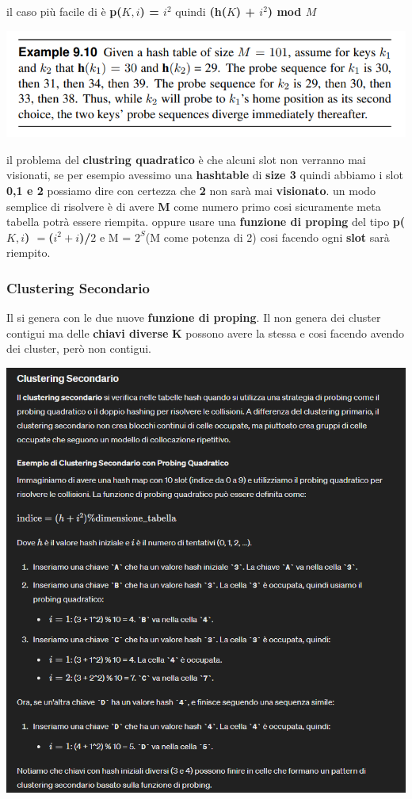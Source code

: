 il caso più facile di è\textbf{ p($K,i$) = $i^2$} quindi \textbf{(h($K$) + $i^2$) mod $M$}
\begin{center}
    \includegraphics[scale = 0.6]{Capitoli/HashTable/Esempi/EsempioQuadratic.png}
\end{center}
il problema del \textbf{clustring quadratico} è che alcuni slot non verranno mai visionati, se per esempio avessimo una \textbf{hashtable} di \textbf{size 3} quindi abbiamo i slot \textbf{0,1 e 2} possiamo dire con certezza che \textbf{2} non sarà mai \textbf{visionato}. 
un modo semplice di risolvere è di avere \textbf{M} come numero primo cosi sicuramente meta tabella potrà essere riempita. oppure usare una \textbf{funzione di proping} del tipo \textbf{p($K,i$) $=$($i^2 + i$)/$2$} e M = $2^S$(M come potenza di 2) cosi facendo ogni \textbf{slot} sarà riempito.

\subsubsection{Clustering Secondario}
Il \textbf{\textcolor{blue}{}} si genera con le due nuove \textbf{funzione di proping}. Il \textbf{\textcolor{blue}{}} non genera dei cluster contigui ma delle \textbf{chiavi diverse} \textbf{K} possono avere la stessa \textbf{\textcolor{blue}{}} e cosi facendo avendo dei cluster, però non contigui.
\begin{center}
    \includegraphics[scale = 0.8]{Capitoli/HashTable/Esempi/Esempio clustering.png}
\end{center}
\newpage
